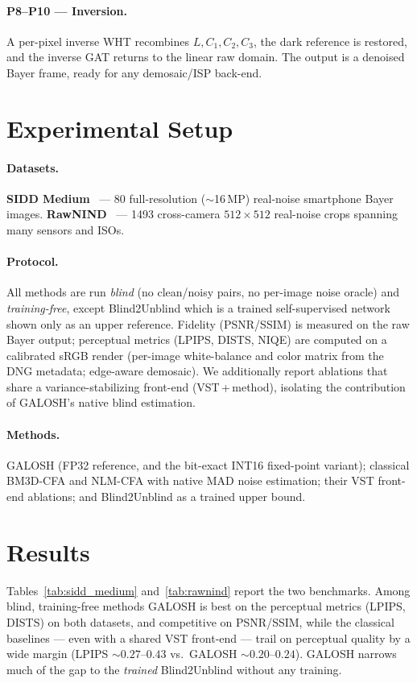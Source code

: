 \documentclass[10pt,twocolumn]{article}
\begin{document}
\paragraph{P8--P10 --- Inversion.}
A per-pixel inverse WHT recombines $L,C_1,C_2,C_3$, the dark reference is restored,
and the inverse GAT returns to the linear raw domain. The output is a denoised
Bayer frame, ready for any demosaic/ISP back-end.

\section{Experimental Setup}\label{sec:exp}
\paragraph{Datasets.} \textbf{SIDD Medium}~\cite{sidd} --- 80 full-resolution
($\sim$16\,MP) real-noise smartphone Bayer images. \textbf{RawNIND}~\cite{rawnind}
--- 1493 cross-camera $512{\times}512$ real-noise crops spanning many sensors and
ISOs.

\paragraph{Protocol.} All methods are run \emph{blind} (no clean/noisy pairs, no
per-image noise oracle) and \emph{training-free}, except Blind2Unblind which is a
trained self-supervised network shown only as an upper reference. Fidelity
(PSNR/SSIM) is measured on the raw Bayer output; perceptual metrics (LPIPS, DISTS,
NIQE) are computed on a calibrated sRGB render (per-image white-balance and color
matrix from the DNG metadata; edge-aware demosaic). We additionally report
ablations that share a variance-stabilizing front-end (VST\,+\,method), isolating
the contribution of GALOSH's native blind estimation.

\paragraph{Methods.} GALOSH (FP32 reference, and the bit-exact INT16 fixed-point
variant); classical BM3D-CFA and NLM-CFA with native MAD noise estimation; their
VST front-end ablations; and Blind2Unblind as a trained upper bound.

\section{Results}\label{sec:results}
Tables~\ref{tab:sidd_medium} and~\ref{tab:rawnind} report the two benchmarks.
Among blind, training-free methods GALOSH is best on the perceptual metrics
(LPIPS, DISTS) on both datasets, and competitive on PSNR/SSIM, while the classical
baselines --- even with a shared VST front-end --- trail on perceptual quality by
a wide margin (LPIPS $\sim\!0.27$--$0.43$ vs.\ GALOSH $\sim\!0.20$--$0.24$). GALOSH
narrows much of the gap to the \emph{trained} Blind2Unblind without any training.
\end{document}
